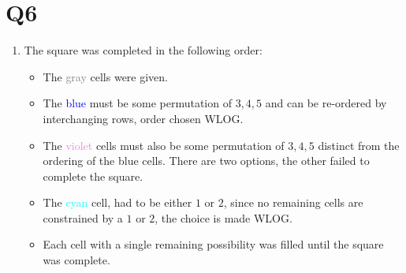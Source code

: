 \documentclass[a4paper, 11pt]{article}
\begin{document}
\section*{Q6}
\begin{enumerate}[label=(\alph*)]
	\item The square was completed in the following order:
	\begin{itemize}
		\item The \textcolor{gray}{gray} cells were given. 
		\item The \textcolor{blue}{blue} must be some permutation of $3,4,5$ and can be re-ordered by interchanging rows, order chosen WLOG. 
		\item The \textcolor{violet}{violet} cells must also be some permutation of $3,4,5$ distinct from the ordering of the blue cells. There are two options, the other failed to complete the square. 
		\item The \textcolor{cyan}{cyan} cell, had to be either $1$ or $2$, since no remaining cells are constrained by a $1$ or $2$, the choice is made WLOG.
		\item Each cell with a single remaining possibility was filled until the square was complete. 
	\end{itemize}



	\begin{center}
\end{center}
\end{enumerate}
\end{document}
